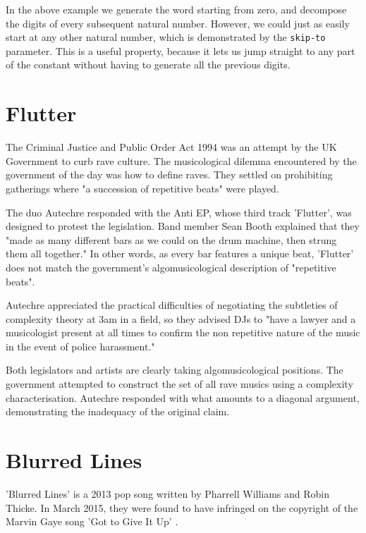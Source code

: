 \documentclass[numbers]{sigplanconf}
\begin{document}
In the above example we generate the word starting from zero, and decompose the digits of
every subsequent natural number. However, we could just as easily start at any other natural number, which is demonstrated
by the \verb|skip-to| parameter. This is a useful property, because it lets us jump straight to any part of the constant
without having to generate all the previous digits.

\section{Flutter}

The Criminal Justice and Public Order Act 1994 was an attempt by the UK Government to curb rave culture. The musicological
dilemma encountered by the government of the day was how to define raves. They settled on prohibiting gatherings where
"a succession of repetitive beats" were played\cite{Joseph Gallivan on pop}.

The duo Autechre responded with the Anti EP\cite{Anti EP}, whose third track 'Flutter', was designed to protest the legislation.
Band member
Sean Booth explained that they "made as many different bars as we could on the drum machine, then strung them all together."
\cite{Joseph Gallivan on pop}
In other words, as every bar features a unique beat, 'Flutter' does not match the government's algomusicological description
of "repetitive beats".

Autechre appreciated the practical difficulties of negotiating the subtleties of complexity theory at 3am in a field,
so they advised DJs to "have a lawyer and a musicologist present at all times to confirm the non repetitive nature of the
music in the event of police harassment."\cite{Joseph Gallivan on pop}

Both legislators and artists are clearly taking algomusicological positions. The government attempted to construct the set
of all rave musics using a complexity characterisation. Autechre responded with what amounts to a diagonal argument, demonstrating
the inadequacy of the original claim.

\section{Blurred Lines}

'Blurred Lines' is a 2013 pop song written by Pharrell Williams and Robin Thicke\cite{Blurred Lines}. In March 2015,
they were found to have infringed on the copyright of the Marvin Gaye song 'Got to Give It Up'\cite{Got to Give It Up}
\cite{USA Today}.
\end{document}

